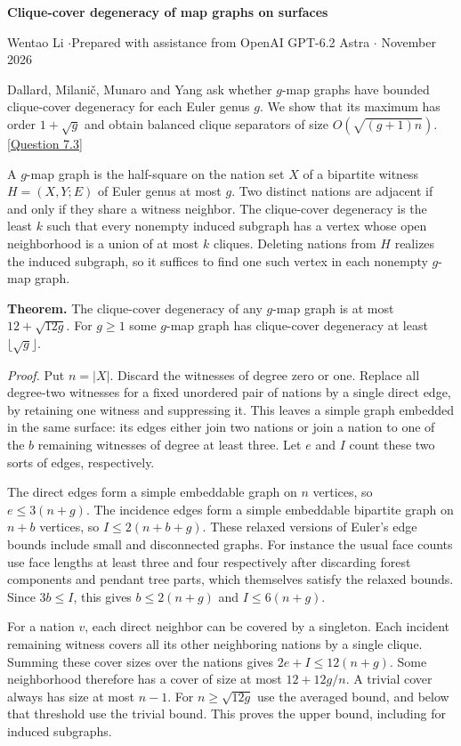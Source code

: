 \documentclass[11pt]{article}
\begin{document}
\begin{center}{\Large\bfseries Clique-cover degeneracy of map graphs on surfaces}\par
\small Wentao Li \enspace$\cdot$\enspace Prepared with assistance from OpenAI GPT-6.2 Astra \enspace$\cdot$ November 2026\end{center}

Dallard, Milani\v c, Munaro and Yang ask whether $g$-map graphs have bounded clique-cover degeneracy for each Euler genus $g$. We show that its maximum has order $1+\sqrt g$ and obtain balanced clique separators of size $O(\sqrt{(g+1)n})$. [\href{https://arxiv.org/abs/2506.12424}{Question 7.3}]

A $g$-map graph is the half-square on the nation set $X$ of a bipartite witness $H=(X,Y;E)$ of Euler genus at most $g$. Two distinct nations are adjacent if and only if they share a witness neighbor. The clique-cover degeneracy is the least $k$ such that every nonempty induced subgraph has a vertex whose open neighborhood is a union of at most $k$ cliques. Deleting nations from $H$ realizes the induced subgraph, so it suffices to find one such vertex in each nonempty $g$-map graph.

\textbf{Theorem.} The clique-cover degeneracy of any $g$-map graph is at most $12+\sqrt{12g}$. For $g\ge1$ some $g$-map graph has clique-cover degeneracy at least $\lfloor\sqrt g\rfloor$.

\textit{Proof.} Put $n=|X|$. Discard the witnesses of degree zero or one. Replace all degree-two witnesses for a fixed unordered pair of nations by a single direct edge, by retaining one witness and suppressing it. This leaves a simple graph embedded in the same surface: its edges either join two nations or join a nation to one of the $b$ remaining witnesses of degree at least three. Let $e$ and $I$ count these two sorts of edges, respectively.

The direct edges form a simple embeddable graph on $n$ vertices, so $e\le3(n+g)$. The incidence edges form a simple embeddable bipartite graph on $n+b$ vertices, so $I\le2(n+b+g)$. These relaxed versions of Euler's edge bounds include small and disconnected graphs. For instance the usual face counts use face lengths at least three and four respectively after discarding forest components and pendant tree parts, which themselves satisfy the relaxed bounds. Since $3b\le I$, this gives $b\le2(n+g)$ and $I\le6(n+g)$.

For a nation $v$, each direct neighbor can be covered by a singleton. Each incident remaining witness covers all its other neighboring nations by a single clique. Summing these cover sizes over the nations gives $2e+I\le12(n+g)$. Some neighborhood therefore has a cover of size at most $12+12g/n$. A trivial cover always has size at most $n-1$. For $n\ge\sqrt{12g}$ use the averaged bound, and below that threshold use the trivial bound. This proves the upper bound, including for induced subgraphs.
\end{document}
